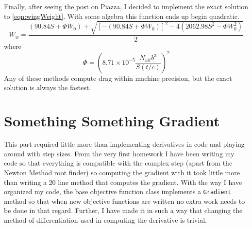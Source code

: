 \documentclass[12pt,parskip=full]{article}
\numberwithin{subsection}{section}
\begin{document}
		Finally, after seeing the post on Piazza, I decided to implement the exact solution to \cref{eqn:wingWeight}. With some algebra this
		function ends up begin quadratic.
		\begin{equation}
			W_w = \frac{ (90.84S + \Phi W_0) + \sqrt{ [-(90.84S + \Phi W_0)]^2 - 4(2062.98S^2 - \Phi W_0^2)}}{2}
		\end{equation}
		where
		\begin{equation}
			\Phi = \left(8.71\times 10^{-5} \frac{N_{ult}b^3}{S(t/c)}\right )^2
		\end{equation}
		Any of these methods compute drag within machine precision, but the exact solution is always the fastest.
		
	\section{Something Something Gradient}
	
		This part required little more than implementing derivatives in code and playing around with step sizes. From the very first homework
		I have been writing my code so that everything is compatible with the complex step (apart from the Newton Method root finder) so
		computing the gradient with it took little more than writing a 20 line method that computes the gradient. With the way I have organized
		my code, the base objective function class implements a \lstinline$Gradient$ method so that when new objective functions are written no
		extra work needs to be done in that regard. Further, I have made it in such a way that changing the method of differentiation used in
		computing the derivative is trivial.
		
\end{document}
